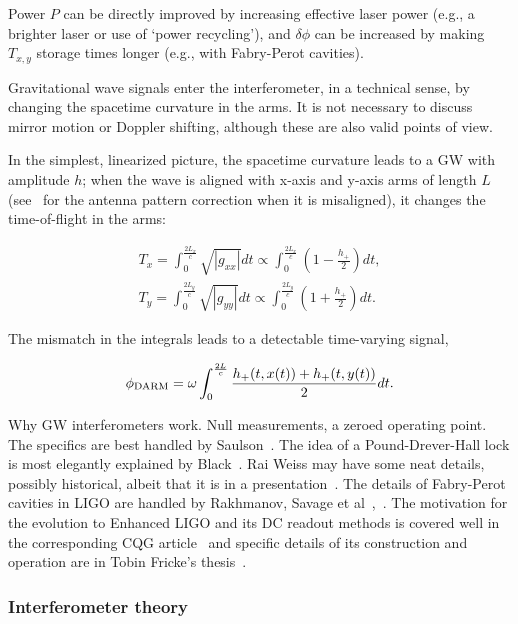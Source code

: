 Power $P$ can be directly improved by increasing effective laser power (e.g., a brighter laser or use of `power recycling'), and $\delta \phi$ can be increased by making $T_{x,y}$ storage times longer (e.g., with Fabry-Perot cavities).

Gravitational wave signals enter the interferometer, in a technical sense, by changing the spacetime curvature in the arms. It is not necessary to discuss mirror motion or Doppler shifting, although these are also valid points of view. 

In the simplest, linearized picture, the spacetime curvature leads to a GW with amplitude $h$; when the wave is aligned with x-axis and y-axis arms of length $L$ (see~\cite{Jaranowski1998} for the antenna pattern correction when it is misaligned), it changes the time-of-flight in the arms:

\begin{eqnarray}
T_x = \int_0^{\frac{2L_x}{c}} \sqrt{|g_{xx}|} dt \propto \int_0^{\frac{2L_x}{c}} \left(1 - \frac{h_+}{2} \right) dt, \\
T_y = \int_0^{\frac{2L_y}{c}} \sqrt{|g_{yy}|} dt \propto \int_0^{\frac{2L_y}{c}} \left(1 + \frac{h_+}{2} \right) dt.
\end{eqnarray}

\noindent The mismatch in the integrals leads to a detectable time-varying signal,

\begin{equation}
\phi_{\textup{DARM}} = \omega \int_0^{\frac{2L}{c}} \frac{h_+ (t, x(t)) + h_+ (t, y(t))}{2} dt.
\end{equation}  



            Why GW interferometers work. Null measurements, a zeroed operating point. The specifics are best handled by Saulson~\cite{Saulson}. The idea of a Pound-Drever-Hall lock is most elegantly explained by Black~\cite{PDHNotes}. Rai Weiss may have some neat details, possibly historical, albeit that it is in a presentation~\cite{LIGOWorks}. The details of Fabry-Perot cavities in LIGO are handled by Rakhmanov, Savage et al~\cite{ResonanceFP},~\cite{ResponsesFP}. The motivation for the evolution to Enhanced LIGO and its DC readout methods is covered well in the corresponding CQG article~\cite{Fricke2009} and specific details of its construction and operation are in Tobin Fricke's thesis~\cite{FrickeThesis}.

            \subsubsection{Interferometer theory}
            \label{interferometer_theory}
        
